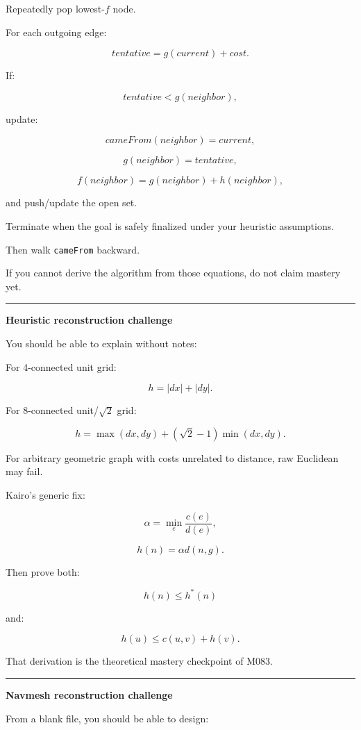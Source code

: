 Repeatedly pop lowest-\(f\) node.

For each outgoing edge:

\[
tentative=
g(current)+cost.
\]

If:

\[
tentative<g(neighbor),
\]

update:

\[
cameFrom(neighbor)=current,
\]

\[
g(neighbor)=tentative,
\]

\[
f(neighbor)=g(neighbor)+h(neighbor),
\]

and push/update the open set.

Terminate when the goal is safely finalized under your heuristic assumptions.

Then walk \texttt{cameFrom} backward.

If you cannot derive the algorithm from those equations, do not claim mastery yet.

\begin{center}\rule{0.5\linewidth}{0.5pt}\end{center}

\textbf{Heuristic reconstruction challenge}

You should be able to explain without notes:

For 4-connected unit grid:

\[
h=
|dx|+|dy|.
\]

For 8-connected unit/\(\sqrt2\) grid:

\[
h=
\max(dx,dy)
+
(\sqrt2-1)\min(dx,dy).
\]

For arbitrary geometric graph with costs unrelated to distance, raw Euclidean may fail.

Kairo's generic fix:

\[
\alpha=
\min_e
\frac{c(e)}{d(e)},
\]

\[
h(n)=
\alpha d(n,g).
\]

Then prove both:

\[
h(n)\le h^*(n)
\]

and:

\[
h(u)\le c(u,v)+h(v).
\]

That derivation is the theoretical mastery checkpoint of M083.

\begin{center}\rule{0.5\linewidth}{0.5pt}\end{center}

\textbf{Navmesh reconstruction challenge}

From a blank file, you should be able to design:

